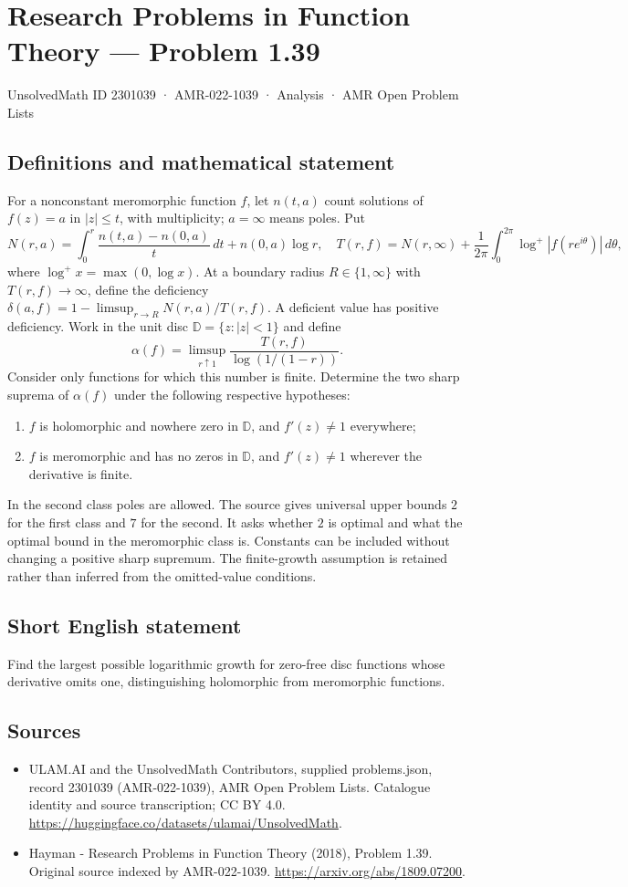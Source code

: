 \documentclass[11pt,a4paper]{article}
\begin{document}
\section*{Research Problems in Function Theory — Problem 1.39}\label{2301039}
{\small UnsolvedMath ID 2301039 · AMR-022-1039 · Analysis · AMR Open Problem Lists}
\subsection{Definitions and mathematical statement}
For a nonconstant meromorphic function $f$, let $n(t,a)$ count solutions of $f(z)=a$ in $|z|\le t$, with multiplicity; $a=\infty$ means poles. Put
\[
N(r,a)=\int_0^r\frac{n(t,a)-n(0,a)}t\,dt+n(0,a)\log r,
\quad T(r,f)=N(r,\infty)+\frac1{2\pi}\int_0^{2\pi}\log^+|f(re^{i\theta})|\,d\theta,
\]
where $\log^+x=\max(0,\log x)$. At a boundary radius $R\in\{1,\infty\}$ with $T(r,f)\to\infty$, define the deficiency
$\delta(a,f)=1-\limsup_{r\to R}N(r,a)/T(r,f)$. A deficient value has positive deficiency.
Work in the unit disc $\mathbb D=\{z:|z|<1\}$ and define
\[
\alpha(f)=\limsup_{r\uparrow1}\frac{T(r,f)}{\log(1/(1-r))}.
\]
Consider only functions for which this number is finite. Determine the two sharp suprema of $\alpha(f)$ under the following respective hypotheses:
\begin{enumerate}
\item $f$ is holomorphic and nowhere zero in $\mathbb D$, and $f'(z)\ne1$ everywhere;
\item $f$ is meromorphic and has no zeros in $\mathbb D$, and $f'(z)\ne1$ wherever the derivative is finite.
\end{enumerate}
In the second class poles are allowed. The source gives universal upper bounds $2$ for the first class and $7$ for the second. It asks whether $2$ is optimal and what the optimal bound in the meromorphic class is. Constants can be included without changing a positive sharp supremum. The finite-growth assumption is retained rather than inferred from the omitted-value conditions.
\subsection{Short English statement}
Find the largest possible logarithmic growth for zero-free disc functions whose derivative omits one, distinguishing holomorphic from meromorphic functions.
\subsection{Sources}
\begin{itemize}
\item[S1] ULAM.AI and the UnsolvedMath Contributors, supplied problems.json, record 2301039 (AMR-022-1039), AMR Open Problem Lists. Catalogue identity and source transcription; CC BY 4.0.
\url{https://huggingface.co/datasets/ulamai/UnsolvedMath}.
\item[S2] Hayman - Research Problems in Function Theory (2018), Problem 1.39. Original source indexed by AMR-022-1039.
\url{https://arxiv.org/abs/1809.07200}.
\end{itemize}
\end{document}
